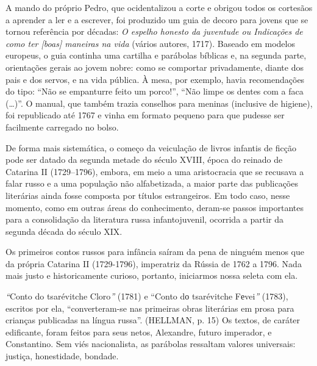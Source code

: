 A mando do próprio Pedro, que ocidentalizou a corte e obrigou todos os
cortesãos a aprender a ler e a escrever, foi produzido um guia de decoro
para jovens que se tornou referência por décadas: \emph{O espelho
honesto da juventude ou Indicações de como ter {[}boas{]} maneiras na
vida} (vários autores, 1717). Baseado em modelos europeus, o guia
continha uma cartilha e parábolas bíblicas e, na segunda parte,
orientações gerais ao jovem nobre: como se comportar privadamente,
diante dos pais e dos servos, e na vida pública. À mesa, por exemplo,
havia recomendações do tipo: ``Não se empanturre feito um porco!'',
``Não limpe os dentes com a faca (\ldots{})''. O manual, que também
trazia conselhos para meninas (inclusive de higiene), foi republicado
até 1767 e vinha em formato pequeno para que pudesse ser facilmente
carregado no bolso.

De forma mais sistemática, o começo da veiculação de livros infantis de
ficção pode ser datado da segunda metade do século XVIII, época do
reinado de Catarina II (1729--1796), embora, em meio a uma aristocracia
que se recusava a falar russo e a uma população não alfabetizada, a
maior parte das publicações literárias ainda fosse composta por títulos
estrangeiros. Em todo caso, nesse momento, como em outras áreas do
conhecimento, deram-se passos importantes para a consolidação da
literatura russa infantojuvenil, ocorrida a partir da segunda década do
século XIX.

Os primeiros contos russos para infância saíram da pena de ninguém menos
que da própria Catarina II (1729-1796), imperatriz da Rússia de 1762 a
1796. Nada mais justo e historicamente curioso, portanto, iniciarmos
nossa seleta com ela.

\emph{``}Conto do tsarévitche Cloro\emph{''} (1781) e ``Conto dо
tsarévitche Fеvei\emph{''} (1783), escritos por ela, ``converteram-se
nas primeiras obras literárias em prosa para crianças publicadas na
língua russa''. (HELLMAN, p. 15) Os textos, de caráter edificante, foram
feitos para seus netos, Alexandre, futuro imperador, e Constantino. Sem
viés nacionalista, as parábolas ressaltam valores universais: justiça,
honestidade, bondade.

